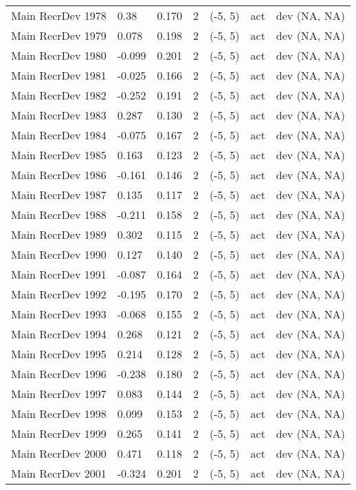 \documentclass[11pt,
  english,
  letterpaper,
]{article}
\begin{document}
\begin{landscape}
\begin{longtable}[t]{>{\raggedright\arraybackslash}p{7.5cm}lllll>{\raggedright\arraybackslash}p{3.5cm}}
Main RecrDev 1978 & 0.38 & 0.170 & 2 & (-5, 5) & act & dev (NA, NA)\\
Main RecrDev 1979 & 0.078 & 0.198 & 2 & (-5, 5) & act & dev (NA, NA)\\
Main RecrDev 1980 & -0.099 & 0.201 & 2 & (-5, 5) & act & dev (NA, NA)\\
Main RecrDev 1981 & -0.025 & 0.166 & 2 & (-5, 5) & act & dev (NA, NA)\\
Main RecrDev 1982 & -0.252 & 0.191 & 2 & (-5, 5) & act & dev (NA, NA)\\
Main RecrDev 1983 & 0.287 & 0.130 & 2 & (-5, 5) & act & dev (NA, NA)\\
Main RecrDev 1984 & -0.075 & 0.167 & 2 & (-5, 5) & act & dev (NA, NA)\\
Main RecrDev 1985 & 0.163 & 0.123 & 2 & (-5, 5) & act & dev (NA, NA)\\
Main RecrDev 1986 & -0.161 & 0.146 & 2 & (-5, 5) & act & dev (NA, NA)\\
Main RecrDev 1987 & 0.135 & 0.117 & 2 & (-5, 5) & act & dev (NA, NA)\\
Main RecrDev 1988 & -0.211 & 0.158 & 2 & (-5, 5) & act & dev (NA, NA)\\
Main RecrDev 1989 & 0.302 & 0.115 & 2 & (-5, 5) & act & dev (NA, NA)\\
Main RecrDev 1990 & 0.127 & 0.140 & 2 & (-5, 5) & act & dev (NA, NA)\\
Main RecrDev 1991 & -0.087 & 0.164 & 2 & (-5, 5) & act & dev (NA, NA)\\
Main RecrDev 1992 & -0.195 & 0.170 & 2 & (-5, 5) & act & dev (NA, NA)\\
Main RecrDev 1993 & -0.068 & 0.155 & 2 & (-5, 5) & act & dev (NA, NA)\\
Main RecrDev 1994 & 0.268 & 0.121 & 2 & (-5, 5) & act & dev (NA, NA)\\
Main RecrDev 1995 & 0.214 & 0.128 & 2 & (-5, 5) & act & dev (NA, NA)\\
Main RecrDev 1996 & -0.238 & 0.180 & 2 & (-5, 5) & act & dev (NA, NA)\\
Main RecrDev 1997 & 0.083 & 0.144 & 2 & (-5, 5) & act & dev (NA, NA)\\
Main RecrDev 1998 & 0.099 & 0.153 & 2 & (-5, 5) & act & dev (NA, NA)\\
Main RecrDev 1999 & 0.265 & 0.141 & 2 & (-5, 5) & act & dev (NA, NA)\\
Main RecrDev 2000 & 0.471 & 0.118 & 2 & (-5, 5) & act & dev (NA, NA)\\
Main RecrDev 2001 & -0.324 & 0.201 & 2 & (-5, 5) & act & dev (NA, NA)\\

\end{longtable}
\end{landscape}
\end{document}
